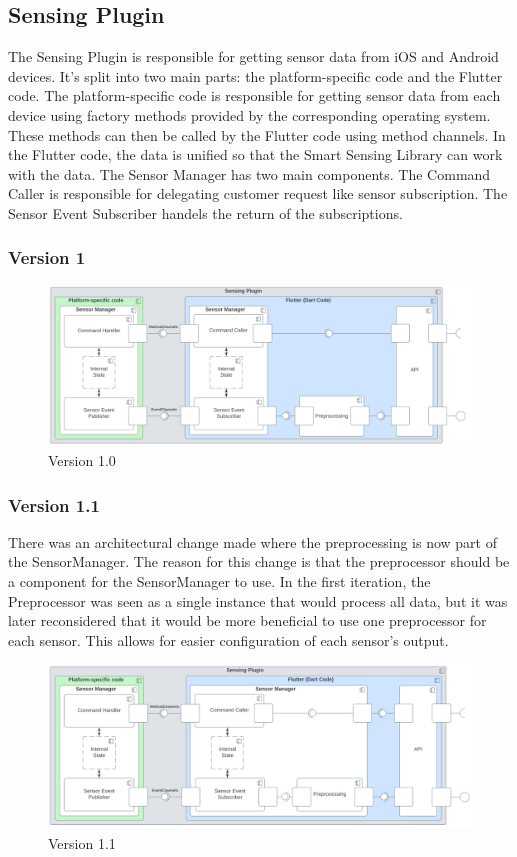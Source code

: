 \documentclass[12pt]{article}
\newcounter{fr}
\begin{document}
\subsection{Sensing Plugin}
The Sensing Plugin is responsible for getting sensor data from iOS and Android devices. It's split into two main parts: the platform-specific code and the Flutter code. The platform-specific code is responsible for getting sensor data from each device using factory methods provided by the corresponding operating system. These methods can then be called by the Flutter code using method channels. In the Flutter code, the data is unified so that the Smart Sensing Library can work with the data. The Sensor Manager has two main components. The Command Caller is responsible for delegating customer request like sensor subscription. The Sensor Event Subscriber handels the return of the subscriptions.
\subsubsection{Version 1}
\begin{figure}[ht]
\includegraphics[width=1\textwidth]{Graphics/SmartSensingPluginOld.png}
\caption{\label{fig:bild3} Version 1.0}
\end{figure}

\subsubsection{Version 1.1}
There was an architectural change made where the preprocessing is now part of the SensorManager. The reason for this change is that the preprocessor should be a component for the SensorManager to use. In the first iteration, the Preprocessor was seen as a single instance that would process all data, but it was later reconsidered that it would be more beneficial to use one preprocessor for each sensor. This allows for easier configuration of each sensor's output.
\begin{figure}[ht]
\includegraphics[width=1\textwidth]{Graphics/SmartSensingPluginNew.png}
\caption{\label{fig:bild4} Version 1.1}
\end{figure}
\end{document}
